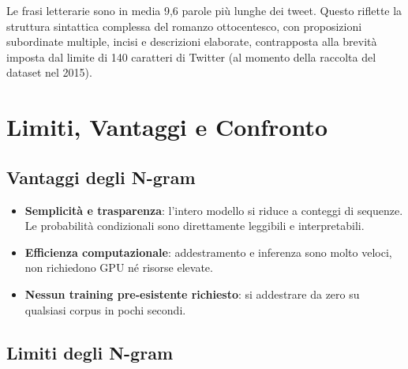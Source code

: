 \documentclass[12pt, a4paper]{article}
\begin{document}
Le frasi letterarie sono in media 9,6 parole più lunghe dei tweet.
Questo riflette la struttura sintattica complessa del romanzo
ottocentesco, con proposizioni subordinate multiple, incisi e
descrizioni elaborate, contrapposta alla brevità imposta dal
limite di 140 caratteri di Twitter (al momento della raccolta
del dataset nel 2015).

\section{Limiti, Vantaggi e Confronto}

\subsection{Vantaggi degli N-gram}

\begin{itemize}[leftmargin=1.5cm]
    \item \textbf{Semplicità e trasparenza}: l'intero modello si riduce
          a conteggi di sequenze. Le probabilità condizionali sono
          direttamente leggibili e interpretabili.
    \item \textbf{Efficienza computazionale}: addestramento e inferenza
          sono molto veloci, non richiedono GPU né risorse elevate.
    \item \textbf{Nessun training pre-esistente richiesto}: si addestrare
          da zero su qualsiasi corpus in pochi secondi.
\end{itemize}

\subsection{Limiti degli N-gram}
\end{document}

